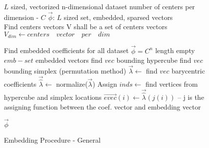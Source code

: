 	\begin{figure} 
		\begin{algorithm} 
		\caption{Embedding Procedure - General}
		\begin{algorithmic}[1]
			
			\REQUIRE $L$ sized, vectorized n-dimensional dataset
			\REQUIRE number of centers per dimension - $C$
			\ENSURE $\overrightarrow{\phi}$: $L$ sized set, embedded, sparsed vectors\\
			
			\STATE Find centers vectors
			\STATE V shall be a set of centers vectors
			\STATE $V_{dim} \leftarrow centers \quad vector \quad per \quad dim$
			\ENDFOR
			
			\STATE Find embedded coefficients for all dataset
			\STATE $\overrightarrow{\phi} = C^n$ length empty $emb-set$ embedded vectors
			\STATE find $vec$ bounding hypercube 
			\STATE find $vec$ bounding simplex (permutation method)
			\STATE $\overrightarrow{\lambda} \leftarrow$ find $vec$ barycentric coefficients 
			\STATE $\overrightarrow{\hat{\lambda}} \leftarrow$ normalize($\overrightarrow{\lambda}$)
			\ENDFOR
			\STATE Assign
			\STATE $inds \leftarrow$ find vertices from hypercube and simplex locations
			\STATE $\overrightarrow{evec}(i) \leftarrow \overrightarrow{\hat{\lambda}}(j(i))$ -- j is the assigning function between the coef. vector and embedding vector
			\ENDFOR
			\ENDFOR
			
			\RETURN $\overrightarrow{\phi}$
			
		\end{algorithmic}
	 
	\end{algorithm}
	\end{figure}
